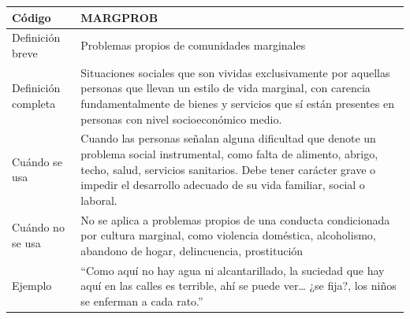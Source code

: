 \begin{longtable}[]{@{}ll@{}}
\toprule
\begin{minipage}[b]{0.07\columnwidth}\raggedright
Código\strut
\end{minipage} & \begin{minipage}[b]{0.87\columnwidth}\raggedright
MARGPROB\strut
\end{minipage}\tabularnewline
\midrule
\endhead
\begin{minipage}[t]{0.07\columnwidth}\raggedright
Definición breve\strut
\end{minipage} & \begin{minipage}[t]{0.87\columnwidth}\raggedright
Problemas propios de comunidades marginales\strut
\end{minipage}\tabularnewline
\begin{minipage}[t]{0.07\columnwidth}\raggedright
Definición completa\strut
\end{minipage} & \begin{minipage}[t]{0.87\columnwidth}\raggedright
Situaciones sociales que son vividas exclusivamente por aquellas
personas que llevan un estilo de vida marginal, con carencia
fundamentalmente de bienes y servicios que sí están presentes en
personas con nivel socioeconómico medio.\strut
\end{minipage}\tabularnewline
\begin{minipage}[t]{0.07\columnwidth}\raggedright
Cuándo se usa\strut
\end{minipage} & \begin{minipage}[t]{0.87\columnwidth}\raggedright
Cuando las personas señalan alguna dificultad que denote un problema
social instrumental, como falta de alimento, abrigo, techo, salud,
servicios sanitarios. Debe tener carácter grave o impedir el desarrollo
adecuado de su vida familiar, social o laboral.\strut
\end{minipage}\tabularnewline
\begin{minipage}[t]{0.07\columnwidth}\raggedright
Cuándo no se usa\strut
\end{minipage} & \begin{minipage}[t]{0.87\columnwidth}\raggedright
No se aplica a problemas propios de una conducta condicionada por
cultura marginal, como violencia doméstica, alcoholismo, abandono de
hogar, delincuencia, prostitución\strut
\end{minipage}\tabularnewline
\begin{minipage}[t]{0.07\columnwidth}\raggedright
Ejemplo\strut
\end{minipage} & \begin{minipage}[t]{0.87\columnwidth}\raggedright
``Como aquí no hay agua ni alcantarillado, la suciedad que hay aquí en
las calles es terrible, ahí se puede ver\ldots{} ¿se fija?, los niños se
enferman a cada rato.''\strut
\end{minipage}\tabularnewline
\bottomrule
\end{longtable}


